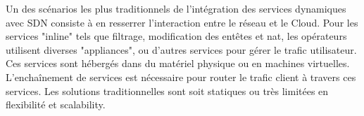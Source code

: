 Un des scénarios les plus traditionnels de l'intégration des services dynamiques avec SDN consiste à en resserrer l'interaction entre le réseau et le Cloud. Pour les services "inline" tels que filtrage, modification des entêtes et \gls{nat}, les opérateurs utilisent diverses "appliances", ou d'autres services pour gérer le trafic utilisateur. Ces services sont hébergés dans du matériel physique ou en machines virtuelles. L’enchaînement de services est nécessaire pour router le trafic client à travers ces services. Les solutions traditionnelles sont soit statiques ou très limitées en flexibilité et \gls{scalability}.




